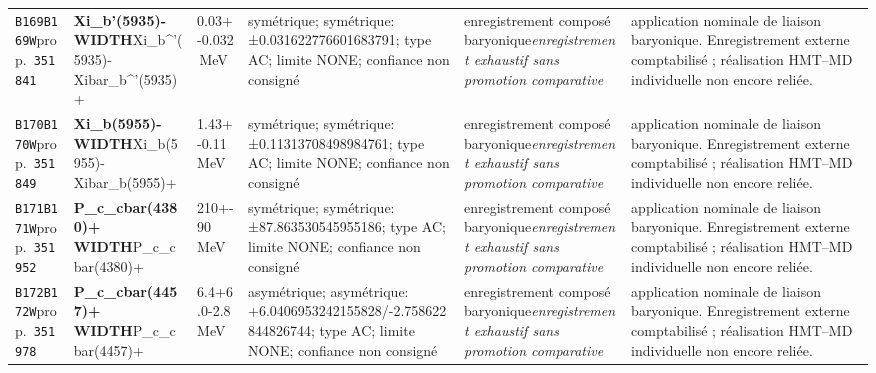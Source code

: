 \begin{landscape}
\begin{longtable}{L{1.85cm}L{4.45cm}L{2.35cm}L{4.05cm}L{3.35cm}L{7.15cm}}
\texttt{B169}\newline \texttt{B169W}\newline prop.\ \texttt{351841} & \textbf{Xi\_\allowbreak{}b'(5935)- WIDTH}\newline Xi\_\allowbreak{}b\textasciicircum{}'(5935)- \textbar{}\allowbreak{} Xibar\_\allowbreak{}b\textasciicircum{}'(5935)+ & 0.03+-0.032\,MeV & symétrique; symétrique: ±0.031622776601683791; type AC; limite NONE; confiance non consigné & enregistrement composé baryonique\newline \emph{enregistrement exhaustif sans promotion comparative} & application nominale de liaison baryonique. Enregistrement externe comptabilisé ; réalisation HMT--MD individuelle non encore reliée. \\
\texttt{B170}\newline \texttt{B170W}\newline prop.\ \texttt{351849} & \textbf{Xi\_\allowbreak{}b(5955)- WIDTH}\newline Xi\_\allowbreak{}b(5955)- \textbar{}\allowbreak{} Xibar\_\allowbreak{}b(5955)+ & 1.43+-0.11\,MeV & symétrique; symétrique: ±0.11313708498984761; type AC; limite NONE; confiance non consigné & enregistrement composé baryonique\newline \emph{enregistrement exhaustif sans promotion comparative} & application nominale de liaison baryonique. Enregistrement externe comptabilisé ; réalisation HMT--MD individuelle non encore reliée. \\
\texttt{B171}\newline \texttt{B171W}\newline prop.\ \texttt{351952} & \textbf{P\_\allowbreak{}c\_\allowbreak{}cbar(4380)+ WIDTH}\newline P\_\allowbreak{}c\_\allowbreak{}cbar(4380)+ & 210+-90\,MeV & symétrique; symétrique: ±87.863530545955186; type AC; limite NONE; confiance non consigné & enregistrement composé baryonique\newline \emph{enregistrement exhaustif sans promotion comparative} & application nominale de liaison baryonique. Enregistrement externe comptabilisé ; réalisation HMT--MD individuelle non encore reliée. \\
\texttt{B172}\newline \texttt{B172W}\newline prop.\ \texttt{351978} & \textbf{P\_\allowbreak{}c\_\allowbreak{}cbar(4457)+ WIDTH}\newline P\_\allowbreak{}c\_\allowbreak{}cbar(4457)+ & 6.4+6.0-2.8\,MeV & asymétrique; asymétrique: +6.0406953242155828/-2.758622844826744; type AC; limite NONE; confiance non consigné & enregistrement composé baryonique\newline \emph{enregistrement exhaustif sans promotion comparative} & application nominale de liaison baryonique. Enregistrement externe comptabilisé ; réalisation HMT--MD individuelle non encore reliée. \\

\end{longtable}
\end{landscape}
